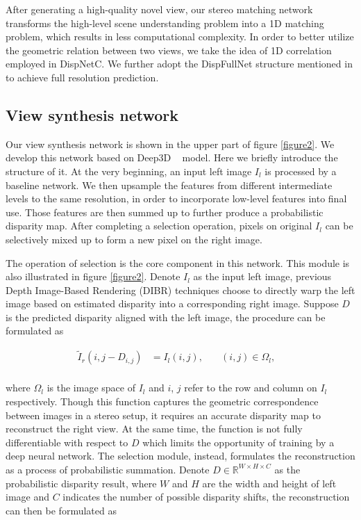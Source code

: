 \documentclass[10pt,twocolumn,letterpaper]{article}
\begin{document}
After generating a high-quality novel view, our stereo matching network transforms the high-level scene understanding problem into a 1D matching problem, which results in less computational complexity. In order to better utilize the geometric relation between two views, we take the idea of 1D correlation employed in DispNetC\cite{mayer2016disp}. We further adopt the DispFullNet structure mentioned in \cite{pang2017cascade} to achieve full resolution prediction. 


\subsection{View synthesis network}
Our view synthesis network is shown in the upper part of figure \ref{figure2}. We develop this network based on Deep3D ~\cite{xie2016deep3d} model. Here we briefly introduce the structure of it. At the very beginning, an input left image $I_{l}$ is processed by a baseline network. We then upsample the features from different intermediate levels to the same resolution, in order to incorporate low-level features into final use. Those features are then summed up to further produce a probabilistic disparity map. After completing a selection operation, pixels on original $I_{l}$ can be selectively mixed up to form a new pixel on the right image.

The operation of selection is the core component in this network. This module is also illustrated in figure \ref{figure2}. Denote $I_{l}$ as the input left image, previous Depth Image-Based Rendering (DIBR) techniques choose to directly warp the left image based on estimated disparity into a corresponding right image. Suppose $D$ is the predicted disparity aligned with the left image, the procedure can be formulated as

\vspace{-8pt}
\begin{equation}
\label{DIBR}
\begin{aligned}
\widetilde{I}_{r}(i,j - D_{i,j})&=I_{l}(i,j),&\quad (i,j)\in{\Omega_{l}},&\\
\end{aligned}
\end{equation}
\vspace{-13pt}

where $\Omega_{l}$ is the image space of $I_{l}$ and $i$, $j$ refer to the row and column on $I_{l}$ respectively. Though this function captures the geometric correspondence between images in a stereo setup, it requires an accurate disparity map to reconstruct the right view. At the same time, the function is not fully differentiable with respect to $D$ which limits the opportunity of training by a deep neural network. The selection module, instead, formulates the reconstruction as a process of probabilistic summation. Denote $D\in\mathbb{R}^{W\times H\times C}$ as the probabilistic disparity result, where $W$ and $H$ are the width and height of left image and 
$C$ indicates the number of possible disparity shifts, the reconstruction can then be formulated as
\end{document}
